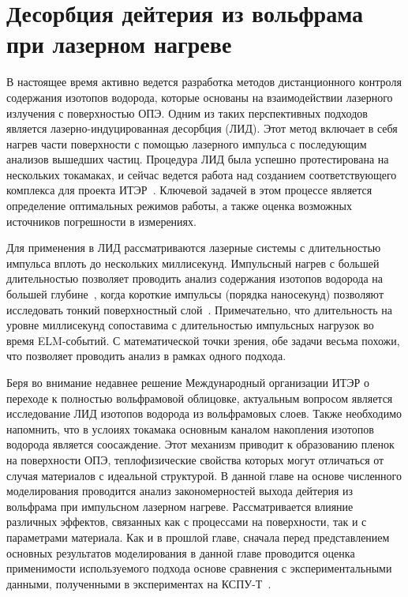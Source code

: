 \chapter{Десорбция дейтерия из вольфрама при лазерном нагреве}\label{ch:ch4}

В настоящее время активно ведется разработка методов дистанционного контроля содержания изотопов водорода, которые основаны на взаимодействии лазерного излучения с поверхностью ОПЭ. Одним из таких перспективных подходов является лазерно-индуцированная десорбция (ЛИД). Этот метод включает в себя нагрев части поверхности с помощью лазерного импульса с последующим анализов вышедших частиц. Процедура ЛИД была успешно протестирована на нескольких токамаках, и сейчас ведется работа над созданием соответствующего комплекса для проекта ИТЭР~\cite{Zlobinski2024}. Ключевой задачей в этом процессе является определение оптимальных режимов работы, а также оценка возможных источников погрешности в измерениях.

Для применения в ЛИД рассматриваются лазерные системы с длительностью импульса вплоть до нескольких миллисекунд. Импульсный нагрев с большей длительностью позволяет проводить анализ содержания изотопов водорода на большей глубине~\cite{Yu2019, Zlobinski2020}, когда короткие импульсы (порядка наносекунд) позволяют исследовать тонкий поверхностный слой~\cite{Gasparyan2021}. Примечательно, что длительность на уровне миллисекунд сопоставима с длительностью импульсных нагрузок во время ELM-событий. С математической точки зрения, обе задачи весьма похожи, что позволяет проводить анализ в рамках одного подхода.

Беря во внимание недавнее решение Международный организации ИТЭР о переходе к полностью вольфрамовой облицовке, актуальным вопросом является исследование ЛИД изотопов водорода из вольфрамовых слоев. Также необходимо напомнить, что в услоиях токамака основным каналом накопления изотопов водорода является соосаждение. Этот механизм приводит к образованию пленок на поверхности ОПЭ, теплофизические свойства которых могут отличаться от случая материалов с идеальной структурой. В данной главе на основе численного моделирования проводится анализ закономерностей выхода дейтерия из вольфрама при импульсном лазерном нагреве. Рассматривается влияние различных эффектов, связанных как с процессами на поверхности, так и с параметрами материала. Как и в прошлой главе, сначала перед представлением основных результатов моделирования в данной главе проводится оценка применимости используемого подхода основе сравнения с экспериментальными данными, полученными в экспериментах на КСПУ-Т~\cite{Poskakalov2020}. 

